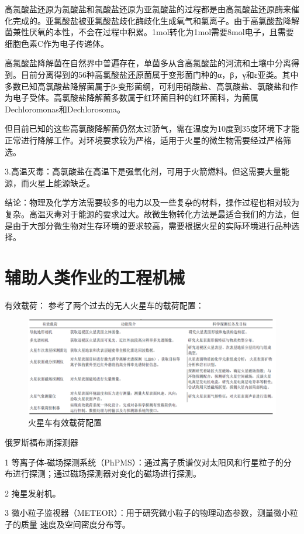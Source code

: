 高氯酸盐还原为氯酸盐和氯酸盐还原为亚氯酸盐的过程都是由高氯酸盐还原酶来催化完成的。亚氯酸盐被亚氯酸盐歧化酶歧化生成氧气和氯离子。由于高氯酸盐降解菌兼性厌氧的本性，不会在过程中积累。1\si{\mole}转化为1\si{\mole}需要8\si{\mole}电子，且需要细胞色素C作为电子传递体。

高氯酸盐降解菌在自然界中普遍存在，单菌多从含高氯酸盐的河流和土壤中分离得到。目前分离得到的56种高氯酸盐还原菌属于变形菌门种的α，β，γ和ε亚类。其中多数已知高氯酸盐降解菌属于β-变形菌纲，可利用硝酸盐、高氯酸盐、氯酸盐和作为电子受体。高氯酸盐降解菌多数属于红环菌目种的红环菌科，为菌属Dechloromonas和Dechlorosoma。

但目前已知的这些高氯酸降解菌仍然太过骄气，需在温度为10度到35度环境下才能正常进行降解工作。对环境要求较为严格，适用于火星的微生物需要经过严格筛选。

3.高温灭毒：高氯酸盐在高温下是强氧化剂，可用于火箭燃料。但这需要大量能源，而火星上能源缺乏。

结论：物理及化学方法需要较多的电力以及一些复杂的材料，操作过程也相对较为复杂。高温灭毒对于能源的要求过大。故微生物转化方法是最适合我们的方法，但是由于大部分微生物对生存环境的要求较高，需要根据火星的实际环境进行品种选择。

\section{辅助人类作业的工程机械}
有效载荷： 参考了两个过去的无人火星车的载荷配置：
\begin{figure}[H]
  \centering
  \includegraphics[width=\textwidth]{figure/effective-load.png}
  \caption{火星车有效载荷配置}
\end{figure}

俄罗斯福布斯探测器

1 等离子体-磁场探测系统（PhPMS）：通过离子质谱仪对太阳风和行星粒子的分布进行探测；通过磁场探测器对变化的磁场进行探测。

2 掩星发射机。

3 微小粒子监视器（METEOR）：用于研究微小粒子的物理动态参数，测量微小粒子的质量 速度及空间密度分布等。

